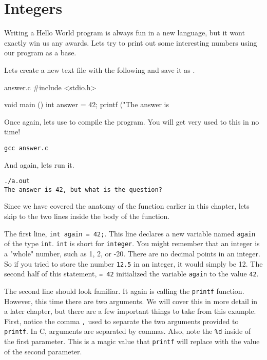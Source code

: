 \section{Integers}

Writing a Hello World program is always fun in a new language, but it wont
exactly win us any awards. Lets try to print out some interesting numbers
using our program as a base.

Lets create a new text file with the following and save it as .

\begin{code}{answer.c}
#include <stdio.h>

void main ()
{
    int answer = 42;
    printf ("The answer is %
}
\end{code}

Once again, lets use  to compile the program. You will get very
used to this in no time!

\begin{Terminal}
\begin{Verbatim}
gcc answer.c
\end{Verbatim}
\end{Terminal}

And again, lets run it.

\begin{Terminal}
\begin{Verbatim}
./a.out
The answer is 42, but what is the question?
\end{Verbatim}
\end{Terminal}

Since we have covered the anatomy of the  function earlier in this
chapter, lets skip to the two lines inside the body of the function.

The first line, \verb|int again = 42;|. This line declares a new variable named
\verb|again| of the type \verb|int|. \verb|int| is short for \verb|integer|.
You might remember that an integer is a "whole" number, such as 1, 2, or -20.
There are no decimal points in an integer. So if you tried to store the number
\verb|12.5| in an integer, it would simply be 12. The second half of this
statement, \verb|= 42| initialized the variable \verb|again| to the value
\verb|42|.

The second line should look familiar. It again is calling the \verb|printf|
function. However, this time there are two arguments. We will cover this in
more detail in a later chapter, but there are a few important things to take
from this example. First, notice the comma \verb|,| used to separate the
two arguments provided to \verb|printf|. In C, arguments are separated by
commas. Also, note the \verb|%d| inside of the first parameter. This is a
magic value that \verb|printf| will replace with the value of the second
parameter.

